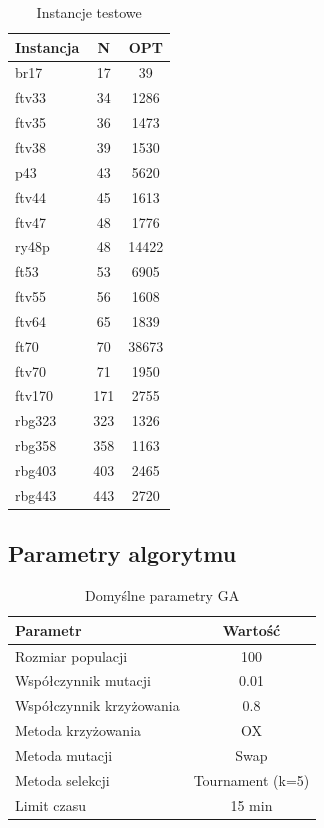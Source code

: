\documentclass[a4paper,12pt]{article}
\begin{document}
\begin{table}[H]
\centering
\caption{Instancje testowe}
\begin{tabular}{|l|c|c|}
\hline
\textbf{Instancja} & \textbf{N} & \textbf{OPT} \\
\hline
br17 & 17 & 39 \\
ftv33 & 34 & 1286 \\
ftv35 & 36 & 1473 \\
ftv38 & 39 & 1530 \\
p43 & 43 & 5620 \\
ftv44 & 45 & 1613 \\
ftv47 & 48 & 1776 \\
ry48p & 48 & 14422 \\
ft53 & 53 & 6905 \\
ftv55 & 56 & 1608 \\
ftv64 & 65 & 1839 \\
ft70 & 70 & 38673 \\
ftv70 & 71 & 1950 \\
ftv170 & 171 & 2755 \\
rbg323 & 323 & 1326 \\
rbg358 & 358 & 1163 \\
rbg403 & 403 & 2465 \\
rbg443 & 443 & 2720 \\
\hline
\end{tabular}
\end{table}

\subsection{Parametry algorytmu}

\begin{table}[H]
\centering
\caption{Domyślne parametry GA}
\begin{tabular}{|l|c|}
\hline
\textbf{Parametr} & \textbf{Wartość} \\
\hline
Rozmiar populacji & 100 \\
Współczynnik mutacji & 0.01 \\
Współczynnik krzyżowania & 0.8 \\
Metoda krzyżowania & OX \\
Metoda mutacji & Swap \\
Metoda selekcji & Tournament (k=5) \\
Limit czasu & 15 min \\
\hline
\end{tabular}
\end{table}
\end{document}
